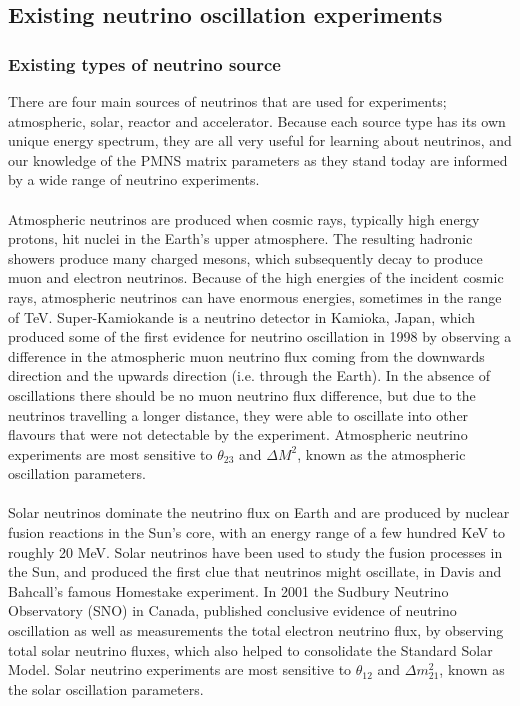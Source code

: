 \documentclass[12pt]{article}
\begin{document}
\subsection{Existing neutrino oscillation experiments}
\subsubsection{Existing types of neutrino source}
There are four main sources of neutrinos that are used for experiments; atmospheric, solar, reactor and accelerator. Because each source type has its own unique energy spectrum, they are all very useful for learning about neutrinos, and our knowledge of the PMNS matrix parameters as they stand today are informed by a wide range of neutrino experiments.\\\\
Atmospheric neutrinos are produced when cosmic rays, typically high energy protons, hit nuclei in the Earth's upper atmosphere. The resulting hadronic showers produce many charged mesons, which subsequently decay to produce muon and electron neutrinos. Because of the high energies of the incident cosmic rays, atmospheric neutrinos can have enormous energies, sometimes in the range of TeV\cite{Zuber}. Super-Kamiokande is a neutrino detector in Kamioka, Japan, which produced some of the first evidence for neutrino oscillation in 1998 by observing a difference in the atmospheric muon neutrino flux coming from the downwards direction and the upwards direction (i.e. through the Earth). In the absence of oscillations there should be no muon neutrino flux difference, but due to the neutrinos travelling a longer distance, they were able to oscillate into other flavours that were not detectable by the experiment\cite{SuperK}. Atmospheric neutrino experiments are most sensitive to $\theta_{23}$ and $\Delta M^2$, known as the atmospheric oscillation parameters.\\\\
Solar neutrinos dominate the neutrino flux on Earth and are produced by nuclear fusion reactions in the Sun's core, with an energy range of a few hundred KeV to roughly 20 MeV. Solar neutrinos have been used to study the fusion processes in the Sun, and produced the first clue that neutrinos might oscillate, in Davis and Bahcall's famous Homestake experiment. In 2001 the Sudbury Neutrino Observatory (SNO) in Canada, published conclusive evidence of neutrino oscillation as well as measurements the total electron neutrino flux, by observing total solar neutrino fluxes, which also helped to consolidate the Standard Solar Model\cite{SNO1}. Solar neutrino experiments are most sensitive to $\theta_{12}$ and $\Delta m_{21}^2$, known as the solar oscillation parameters.\\\\
\end{document}

